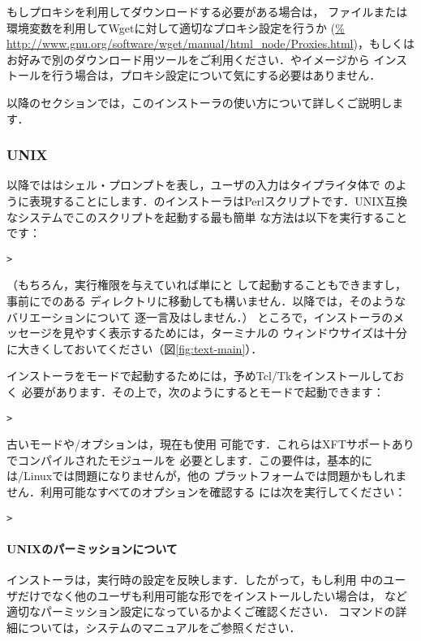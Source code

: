 \documentclass[uplatex,dvipdfmx]{jsarticle}
\begin{document}
もしプロキシを利用してダウンロードする必要がある場合は，%
ファイルまたは環境変数を利用してWgetに対して適切なプロキシ設定を行うか (\url{%
http://www.gnu.org/software/wget/manual/html_node/Proxies.html})，もしくは
お好みで別のダウンロード用ツールをご利用ください．\DVD や\ISO イメージから
インストールを行う場合は，プロキシ設定について気にする必要はありません．

以降のセクションでは，このインストーラの使い方について詳しくご説明します．

\subsubsection{UNIX}

以降では\code{>}はシェル・プロンプトを表し，ユーザの入力はタイプライタ体で
のように表現することにします．\TL のインストーラはPerlスクリプトです．UNIX互換なシステムでこのスクリプトを起動する最も簡単
な方法は以下を実行することです：
%
\begin{alltt}
> 
\end{alltt}
%
（もちろん，実行権限を与えていれば単にと
して起動することもできますし，事前にでのある
ディレクトリに移動しても構いません．以降では，そのようなバリエーションについて
逐一言及はしません．）
%
ところで，インストーラのメッセージを見やすく表示するためには，ターミナルの
ウィンドウサイズは十分に大きくしておいてください（図\ref{fig:text-main}）．

インストーラを\GUI モードで起動するためには，予めTcl/Tkをインストールしておく
必要があります．その上で，次のようにすると\GUI モードで起動できます：
%
\begin{alltt}
> 
\end{alltt}

古いモードや/オプションは，現在も使用
可能です．これらはXFTサポートありでコンパイルされたモジュールを
必要とします．この要件は，基本的には\GNU/Linuxでは問題になりませんが，他の
プラットフォームでは問題かもしれません．利用可能なすべてのオプションを確認する
には次を実行してください：
%
\begin{alltt}
> 
\end{alltt}

\paragraph{UNIXのパーミッションについて}
\TL インストーラは，実行時の設定を反映します．したがって，もし利用
中のユーザだけでなく他のユーザも利用可能な形で\TL をインストールしたい場合は，
など適切なパーミッション設定になっているかよくご確認ください．
コマンドの詳細については，システムのマニュアルをご参照ください．
\end{document}
